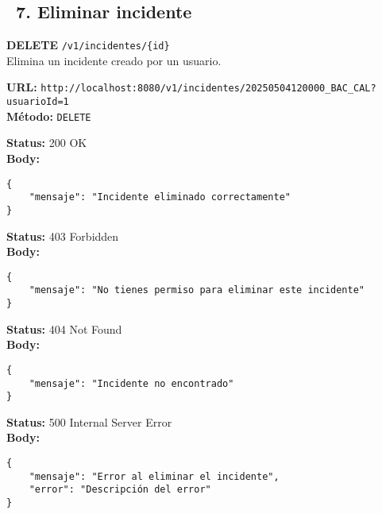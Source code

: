\subsection*{\faServer\ 7. Eliminar incidente}
\begin{tcolorbox}[endpoint]
    \textbf{DELETE} \texttt{/v1/incidentes/\{id\}}\\
    Elimina un incidente creado por un usuario.
\end{tcolorbox}

\begin{tcolorbox}[request]
    \textbf{URL:} \textcolor{urlColor}{\texttt{http://localhost:8080/v1/incidentes/20250504120000\_BAC\_CAL?usuarioId=1}}\\
    \textbf{Método:} \textcolor{methodColor}{\texttt{DELETE}}
\end{tcolorbox}

\begin{tcolorbox}[response]
    \textbf{Status:} 200 OK\\
    \textbf{Body:}
    \begin{verbatim}
{
    "mensaje": "Incidente eliminado correctamente"
}
    \end{verbatim}
\end{tcolorbox}

\begin{tcolorbox}[response]
    \textbf{Status:} 403 Forbidden\\
    \textbf{Body:}
    \begin{verbatim}
{
    "mensaje": "No tienes permiso para eliminar este incidente"
}
    \end{verbatim}
\end{tcolorbox}

\begin{tcolorbox}[response]
    \textbf{Status:} 404 Not Found\\
    \textbf{Body:}
    \begin{verbatim}
{
    "mensaje": "Incidente no encontrado"
}
    \end{verbatim}
\end{tcolorbox}

\begin{tcolorbox}[response]
    \textbf{Status:} 500 Internal Server Error\\
    \textbf{Body:}
    \begin{verbatim}
{
    "mensaje": "Error al eliminar el incidente",
    "error": "Descripción del error"
}
    \end{verbatim}
\end{tcolorbox}
